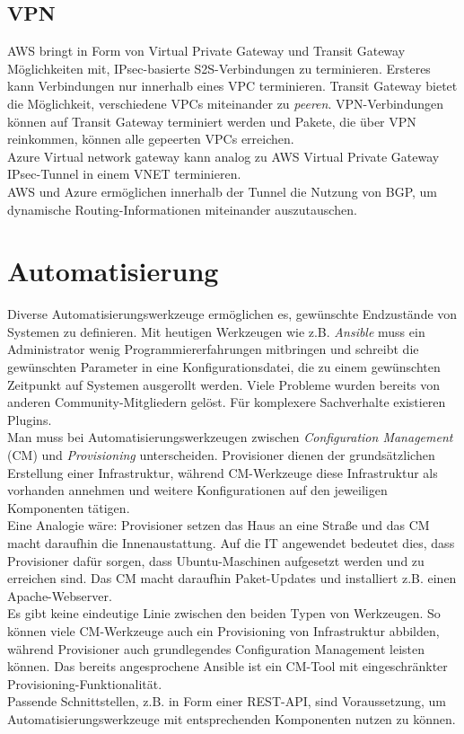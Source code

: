 \subsection{VPN}
AWS bringt in Form von Virtual Private Gateway und Transit Gateway Möglichkeiten mit, IPsec-basierte S2S-Verbindungen zu terminieren. Ersteres kann Verbindungen nur innerhalb eines VPC terminieren. Transit Gateway bietet die Möglichkeit, verschiedene VPCs miteinander zu \textit{peeren}. VPN-Verbindungen können auf Transit Gateway terminiert werden und Pakete, die über VPN reinkommen, können alle gepeerten VPCs erreichen.\\
Azure Virtual network gateway kann analog zu AWS Virtual Private Gateway IPsec-Tunnel in einem VNET terminieren.\\
AWS und Azure ermöglichen innerhalb der Tunnel die Nutzung von BGP, um dynamische Routing-Informationen miteinander auszutauschen.


\section{Automatisierung}\label{automatisierung}

Diverse Automatisierungswerkzeuge ermöglichen es, gewünschte Endzustände von Systemen zu definieren. Mit heutigen Werkzeugen wie z.B. \textit{Ansible} muss ein Administrator wenig Programmiererfahrungen mitbringen und schreibt die gewünschten Parameter in eine Konfigurationsdatei, die zu einem gewünschten Zeitpunkt auf Systemen ausgerollt werden. Viele Probleme wurden bereits von anderen Community-Mitgliedern gelöst. Für komplexere Sachverhalte existieren Plugins.\\
Man muss bei Automatisierungswerkzeugen zwischen \textit{Configuration Management} (CM) und \textit{Provisioning} unterscheiden. Provisioner dienen der grundsätzlichen Erstellung einer Infrastruktur, während CM-Werkzeuge diese Infrastruktur als vorhanden annehmen und weitere Konfigurationen auf den jeweiligen Komponenten tätigen\cite[S.20]{Brikman2019}.\\
Eine Analogie wäre: Provisioner setzen das Haus an eine Straße und das CM macht daraufhin die Innenaustattung. Auf die IT angewendet bedeutet dies, dass Provisioner dafür sorgen, dass Ubuntu-Maschinen aufgesetzt werden und zu erreichen sind. Das CM macht daraufhin Paket-Updates und installiert z.B. einen Apache-Webserver.\\
Es gibt keine eindeutige Linie zwischen den beiden Typen von Werkzeugen. So können viele CM-Werkzeuge auch ein Provisioning von Infrastruktur abbilden, während Provisioner auch grundlegendes Configuration Management leisten können\cite[S.20]{Brikman2019}. Das bereits angesprochene Ansible ist ein CM-Tool mit eingeschränkter Provisioning-Funktionalität.\\
Passende Schnittstellen, z.B. in Form einer REST-API, sind Voraussetzung, um Automatisierungswerkzeuge mit entsprechenden Komponenten nutzen zu können.


